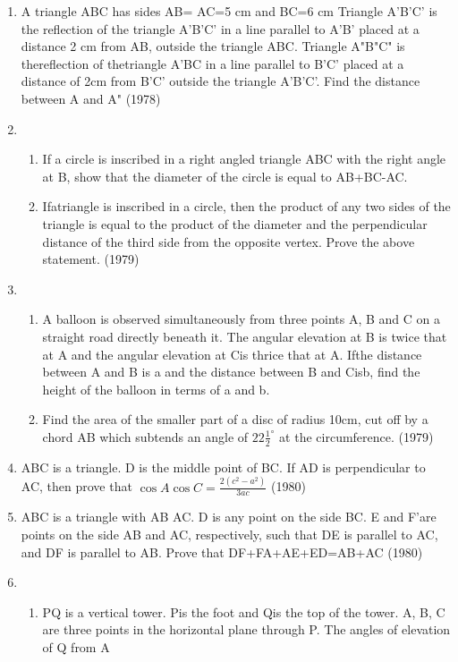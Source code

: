 \documentclass[12pt]{article}
\begin{document}
\begin{enumerate}
\item A triangle ABC has sides AB= AC=5 cm and BC=6 cm Triangle A'B'C' is the reflection of the triangle A'B'C' in a line parallel to A'B' placed at a distance 2 cm from AB, outside the triangle ABC. Triangle A"B"C" is thereflection of thetriangle A'BC in a line parallel to B'C' placed at a distance of 2cm from B'C' outside the triangle A'B'C'. Find the distance between A and A" (1978)
\item 
\begin{enumerate}
\item If a circle is inscribed in a right angled triangle ABC with the right angle at B, show that the diameter of the circle is equal to AB+BC-AC.
\item  Ifatriangle is inscribed in a circle, then the product of any two sides of the triangle is equal to the product of the diameter and the perpendicular distance of the third side from the opposite vertex. Prove the above statement. (1979)
\end{enumerate}
\item 
\begin{enumerate}
\item A balloon is observed simultaneously from three points A, B and C on a straight road directly beneath it. The angular elevation at B is twice that at A and the angular
elevation at Cis thrice that at A. Ifthe distance between A and B is a and the distance between B and Cisb, find the height of the balloon in terms of a and b.
\item  Find the area of the smaller part of a disc of radius 10cm, cut off by a chord AB which subtends an angle of $22\frac{1}{2}^\circ$ at the circumference. (1979)
\end{enumerate}
\item  ABC is a triangle. D is the middle point of BC. If AD is perpendicular to AC, then prove that $\cos A\cos C=\frac{2(c^2-a^2)}{3ac}$ (1980)
\item ABC is a triangle with AB AC. D is any point on the side BC. E and F'are points on the side AB and AC, respectively, such that DE is parallel to AC, and DF is parallel to AB. Prove that DF+FA+AE+ED=AB+AC (1980)
\item 
\begin{enumerate}
\item PQ is a vertical tower. Pis the foot and Qis the top of the tower. A, B, C are three points in the horizontal plane through P. The angles of elevation of Q from A

\end{enumerate}
\end{enumerate}
\end{document}

